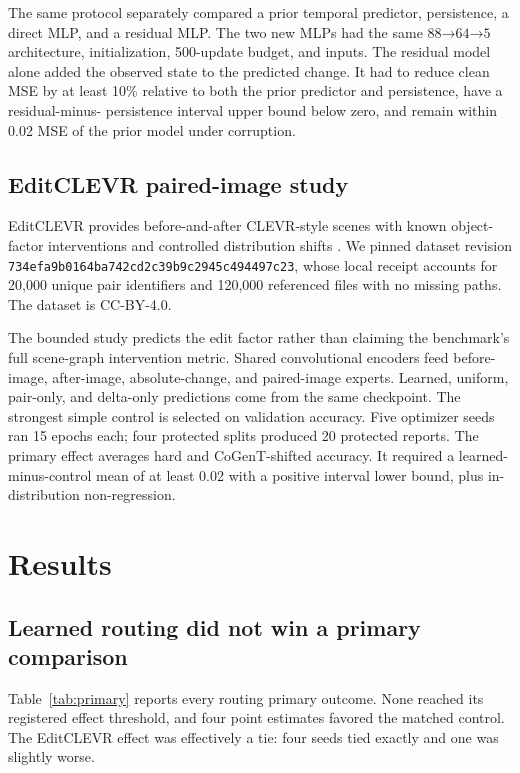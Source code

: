 \documentclass[10pt]{article}
\begin{document}
The same protocol separately compared a prior temporal predictor, persistence, a direct
MLP, and a residual MLP. The two new MLPs had the same $88\mathord{\to}64\mathord{\to}5$
architecture, initialization, 500-update budget, and inputs. The residual model alone
added the observed state to the predicted change. It had to reduce clean MSE by at least
10\% relative to both the prior predictor and persistence, have a residual-minus-
persistence interval upper bound below zero, and remain within 0.02 MSE of the prior model
under corruption.

\subsection{EditCLEVR paired-image study}
EditCLEVR provides before-and-after CLEVR-style scenes with known object-factor
interventions and controlled distribution shifts \cite{karnam2026editclevr}. We pinned
dataset revision \texttt{734efa9b0164ba742cd2c39b9c2945c494497c23}, whose local receipt
accounts for 20,000 unique pair identifiers and 120,000 referenced files with no missing
paths. The dataset is CC-BY-4.0.

The bounded study predicts the edit factor rather than claiming the benchmark's full
scene-graph intervention metric. Shared convolutional encoders feed before-image,
after-image, absolute-change, and paired-image experts. Learned, uniform, pair-only, and
delta-only predictions come from the same checkpoint. The strongest simple control is
selected on validation accuracy. Five optimizer seeds ran 15 epochs each; four protected
splits produced 20 protected reports. The primary effect averages hard and CoGenT-shifted
accuracy. It required a learned-minus-control mean of at least 0.02 with a positive
interval lower bound, plus in-distribution non-regression.

\section{Results}
\subsection{Learned routing did not win a primary comparison}
Table~\ref{tab:primary} reports every routing primary outcome. None reached its registered
effect threshold, and four point estimates favored the matched control. The EditCLEVR
effect was effectively a tie: four seeds tied exactly and one was slightly worse.
\end{document}
